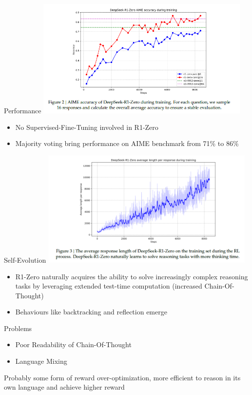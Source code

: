 \documentclass[8pt]{beamer}
\begin{document}
\begin{frame}{Performance}
\centering
\includegraphics[width=0.8\textwidth]{figures/aime.png}

\begin{itemize}
    \item No Supervised-Fine-Tuning involved in R1-Zero
    \item Majority voting bring performance on AIME benchmark from 71\% to 86\%
\end{itemize}

\end{frame}

\begin{frame}{Self-Evolution}
\centering
\includegraphics[width=0.8\textwidth]{figures/perf.png}

\begin{itemize}
    \item R1-Zero naturally acquires the
ability to solve increasingly complex reasoning tasks by leveraging extended test-time computation (increased Chain-Of-Thought)
    \item Behaviours like backtracking and reflection emerge
\end{itemize}

\end{frame}

\begin{frame}{Problems}

\begin{itemize}
    \item Poor Readability of Chain-Of-Thought
    \item Language Mixing
\end{itemize}

\vspace{1em}

Probably some form of reward over-optimization, more efficient to reason in its own language and achieve higher reward

\end{frame}
\end{document}
